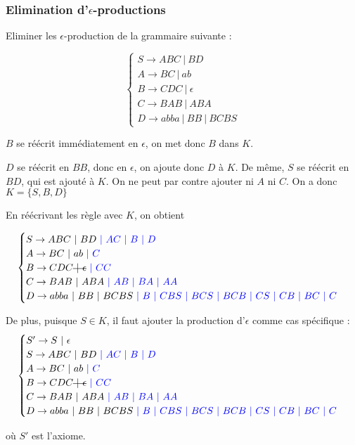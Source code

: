 \subsubsection{Elimination d'$\epsilon$-productions}


\begin{exercice}
Eliminer les $\epsilon$-production de la grammaire suivante :

\[
\begin{cases}
S \rightarrow ABC~|~BD \\
A \rightarrow BC~|~ab \\
B \rightarrow CDC~|~\epsilon \\
C \rightarrow BAB~|~ABA \\
D \rightarrow abba~|~BB~|~BCBS
\end{cases}
\]
\end{exercice}

\begin{correction*}

$B$ se réécrit immédiatement en $\epsilon$, on met donc $B$ dans $K$.

$D$ se réécrit en $BB$, donc en $\epsilon$, on ajoute donc $D$ à $K$. De même, $S$ se réécrit en $BD$, qui est ajouté à $K$. On ne peut par contre ajouter ni $A$ ni $C$. On a donc $K = \{S,B,D\}$

En réécrivant les règle avec $K$, on obtient

\[
\begin{cases}
S \rightarrow ABC~|~BD\textcolor{blue}{~|~AC~|~B~|~D} \\
A \rightarrow BC~|~ab\textcolor{blue}{~|~C} \\
B \rightarrow CDC\text{\st{$~|~\epsilon$}}\textcolor{blue}{~|~CC} \\
C \rightarrow BAB~|~ABA\textcolor{blue}{~|~AB~|~BA~|~AA} \\
D \rightarrow abba~|~BB~|~BCBS\textcolor{blue}{~|~B~|~CBS~|~BCS~|~BCB~|~CS~|~CB~|~BC~|~C}
\end{cases}
\]

De plus, puisque $S \in K$, il faut ajouter la production d'$\epsilon$ comme cas spécifique :
\[
\begin{cases}
S' \rightarrow S~|~\epsilon \\
S \rightarrow ABC~|~BD\textcolor{blue}{~|~AC~|~B~|~D} \\
A \rightarrow BC~|~ab\textcolor{blue}{~|~C} \\
B \rightarrow CDC\text{\st{$~|~\epsilon$}}\textcolor{blue}{~|~CC} \\
C \rightarrow BAB~|~ABA\textcolor{blue}{~|~AB~|~BA~|~AA} \\
D \rightarrow abba~|~BB~|~BCBS\textcolor{blue}{~|~B~|~CBS~|~BCS~|~BCB~|~CS~|~CB~|~BC~|~C}
\end{cases}
\]

où $S'$ est l'axiome.

\end{correction*}

